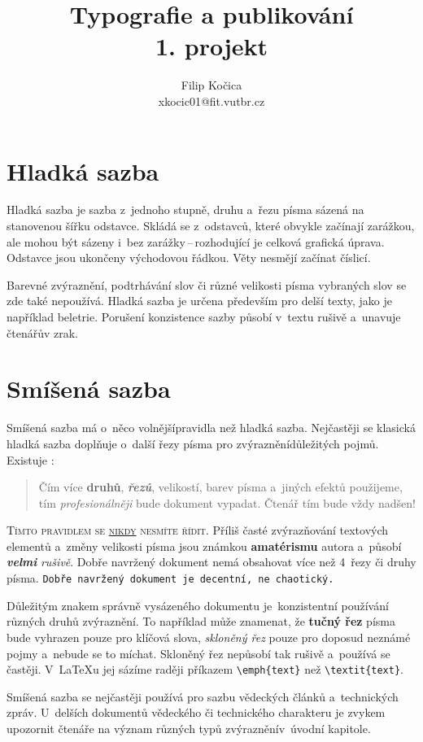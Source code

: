 \documentclass[11pt, a4paper, twocolumn]{article}
\title{Typografie a publikování\\
1. projekt}
\author{Filip Kočica\\ 
xkocic01@fit.vutbr.cz}
\date{}
\begin{document}
\maketitle

\section{Hladká sazba}

Hladká sazba je sazba z~jednoho stupně, druhu a~řezu písma sázená na stanovenou šířku odstavce. Skládá se z~odstavců, které obvykle začínají zarážkou, ale mohou být sázeny i~bez zarážky\,--\,rozhodují\-cí je celková grafická úprava. Odstavce jsou ukončeny východovou řádkou. Věty nesmějí začínat číslicí.
\par
Barevné zvýraznění, podtrhávání slov či různé velikosti písma vybraných slov se zde také nepoužívá. Hladká sazba je určena především pro delší texty, jako je například beletrie. Porušení konzistence sazby působí v~textu rušivě a~unavuje čtenářův zrak.

\section{Smíšená sazba}

Smíšená sazba má o~něco volnější­pravidla než hladká sazba. Nejčastěji se klasická hladká sazba doplňuje o~další řezy písma pro zvýraznění­důležitých pojmů. Existuje :

    \begin{quotation}
        Čím více \textbf{druhů}, \textbf{\emph{řezů}}, {\scriptsize velikostí}, barev písma a~jiných efektů použijeme, tím \emph{profesionálněji} bude dokument vypadat. Čtenář tím bude vždy {\Huge nadšen!}
    \end{quotation}

    \textsc{Tímto pravidlem se \underline{nikdy} nesmíte řídit.} Příliš časté zvýrazňování textových elementů a~změny velikosti {\tiny písma} jsou {\LARGE známkou} \textbf{{\huge amatérismu}} autora a~působí \textbf{\emph{velmi}} \emph{rušivě}. Dobře navržený dokument nemá obsahovat více než 4~řezy či druhy písma. \texttt{Dobře navržený dokument je decentní, ne chaotický.}
\par
    Důležitým znakem správně vysázeného dokumentu je~konzistentní používání různých druhů zvýraznění. To například může znamenat, že \textbf{tučný řez} písma bude vyhrazen pouze pro klíčová slova, \emph{skloněný řez} pouze pro doposud neznámé pojmy a~nebude se to míchat. Skloněný řez nepůsobí tak rušivě a~používá se častěji. V~\LaTeX u jej sázíme raději příkazem \verb|\emph{text}| než \verb|\textit{text}|.
\par
Smíšená sazba se nejčastěji používá pro sazbu vědeckých článků a~technických zpráv. U~delších dokumentů vědeckého či technického charakteru je zvykem upozornit čtenáře na význam různých typů zvýraznění­v~úvodní kapitole.
\end{document}

